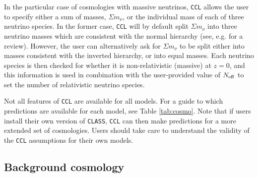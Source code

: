 \documentclass[\docopts]{\docclass}
\newcommand{\ccl}{{\tt CCL}\xspace}
\begin{document}
In the particular case of cosmologies with massive neutrinos, \ccl allows the user to specify either a sum of masses, $\Sigma m_\nu$, or the individual mass of each of three neutrino species. In the former case, \ccl will by default split $\Sigma m_\nu$ into three neutrino masses which are consistent with the normal hierarchy (see, e.g. \cite{Gerbino2017} for a review). However, the user can alternatively ask for $\Sigma m_\nu$ to be split either into masses consistent with the inverted hierarchy, or into equal masses. Each neutrino species is then checked for whether it is non-relativistic (massive) at $z=0$, and this information is used in combination with the user-provided value of $N_{\rm eff}$ to set the number of relativistic neutrino species.

Not all features of \ccl are available for all models. For a guide to which predictions are available for each model, see Table \ref{tab:cosmo}. Note that if users install their own version of {\tt CLASS}, {\tt CCL} can then make predictions for a more extended set of cosmologies. Users should take care to understand the validity of the {\tt CCL} assumptions for their own models.



\subsection{Background cosmology}
\end{document}
